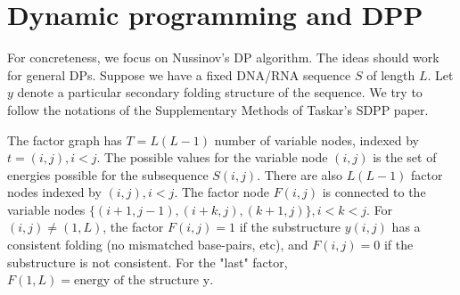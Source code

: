 \documentclass[idxtotoc,hyperref,openany]{labbook} %
\begin{document}

\section{Dynamic programming and DPP}
For concreteness, we focus on Nussinov's DP algorithm. The ideas should work for general DPs.  Suppose we have a fixed DNA/RNA sequence $S$ of length $L$. Let $y$ denote a particular secondary folding structure of the sequence. We try to follow the notations of the Supplementary Methods of Taskar's SDPP paper. 

The factor graph has $T=L(L-1)$ number of variable nodes, indexed by $t=(i,j), i<j$. The possible values for the variable node $(i,j)$ is the set of energies possible for the subsequence $S(i,j)$. There are also $L(L-1)$ factor nodes indexed by $(i,j), i<j$. The factor node $F(i,j)$ is connected to the variable nodes $\{(i+1, j-1), (i+k,j), (k+1, j)\}, i<k<j $. For $(i,j) \neq (1, L)$, the factor $F(i,j) = 1$ if the substructure $y(i,j)$ has a consistent folding (no mismatched base-pairs, etc), and $F(i,j)=0$ if the substructure is not consistent. For the "last" factor, $F(1,L)=\mbox{energy of the structure y}$.
\end{document}

